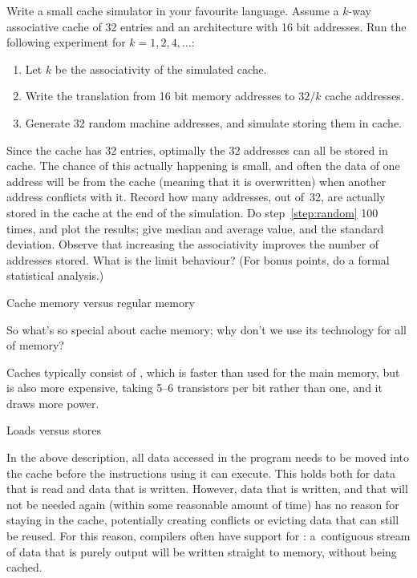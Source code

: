 \begin{exercise}
  Write a small cache simulator in your favourite language. Assume a
  $k$-way associative cache of 32 entries and an architecture with 16
  bit addresses. Run the following
  experiment for $k=1,2,4,\ldots$:
  \begin{enumerate}
  \item Let $k$ be the associativity of the simulated cache.
  \item Write the translation from 16 bit memory addresses to $32/k$ 
    cache addresses.
  \item\label{step:random} Generate 32 random machine addresses, and
    simulate storing them in cache.
  \end{enumerate}
  Since the cache has 32 entries, optimally the 32 addresses can all
  be stored in cache. The chance of this actually happening is small,
  and often the data of one address will be  from the cache
  (meaning that it is overwritten) when another address conflicts with
  it. Record how many addresses, out of~32, are actually stored in the
  cache at the end of the simulation. Do step~\ref{step:random} 100
  times, and plot the results; give median and average value, and the
  standard deviation. Observe that increasing the associativity
  improves the number of addresses stored. What is the limit
  behaviour? (For bonus points, do a formal statistical analysis.)
\end{exercise}


 {Cache memory versus regular memory}

So what's so special about cache memory; why don't we use its
technology for all of memory?

Caches typically
consist of , which is faster than 
used for the main memory, but is also more expensive, taking 5--6
transistors per bit rather than one, and it draws more power.

 {Loads versus stores}

In the above description, all data accessed in the program needs to be
moved into the cache before the instructions using it can
execute. This holds both for data that is read and data that is
written. However, data that is written, and that will not be needed
again (within some reasonable amount of time) has no reason for
staying in the cache, potentially creating conflicts or evicting data
that can still be reused. For this reason, compilers often have
support for : a~contiguous stream of
data that is purely output will be written straight to memory, without
being cached.

